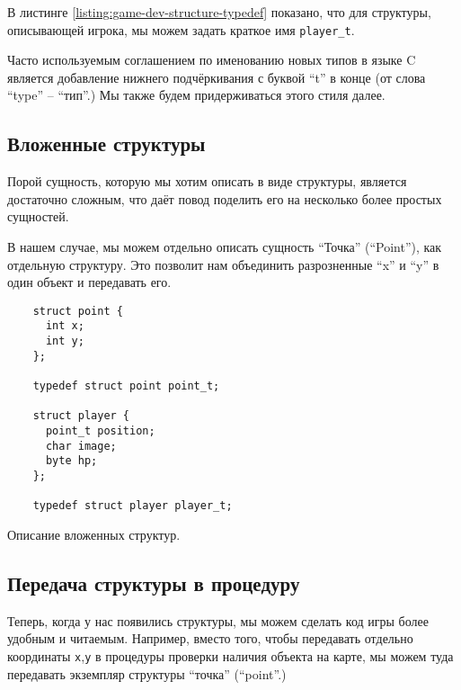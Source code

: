 \documentclass[../sparc.tex]{subfiles}
\begin{document}
В листинге \ref{listing:game-dev-structure-typedef} показано, что для структуры,
описывающей игрока, мы можем задать краткое имя \texttt{player\_t}.

Часто используемым соглашением по именованию новых типов в языке C является
добавление нижнего подчёркивания с буквой ``t'' в конце (от слова ``type'' --
``тип''.)  Мы также будем придерживаться этого стиля далее.

\subsection{Вложенные структуры}

Порой сущность, которую мы хотим описать в виде структуры, является достаточно
сложным, что даёт повод поделить его на несколько более простых сущностей.

В нашем случае, мы можем отдельно описать сущность ``Точка'' (``Point''), как
отдельную структуру.  Это позволит нам объединить разрозненные ``x'' и ``y'' в
один объект и передавать его.

\begin{listing}[H]
  \begin{verbatim}
    struct point {
      int x;
      int y;
    };

    typedef struct point point_t;

    struct player {
      point_t position;
      char image;
      byte hp;
    };

    typedef struct player player_t;
  \end{verbatim}
  \caption{Описание вложенных структур.}
  \label{listing:game-dev-nested-structures}
\end{listing}

\subsection{Передача структуры в процедуру}

Теперь, когда у нас появились структуры, мы можем сделать код игры более удобным
и читаемым. Например, вместо того, чтобы передавать отдельно координаты
\texttt{x},\texttt{y} в процедуры проверки наличия объекта на карте, мы можем
туда передавать экземпляр структуры ``точка'' (``point''.)
\end{document}
